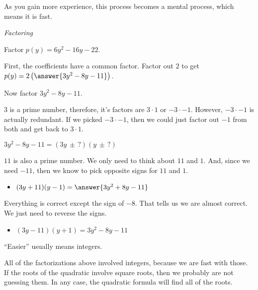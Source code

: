 \documentclass{ximera}
\begin{document}
As you gain more experience, this process becomes a mental process, which means it is fast.






\begin{example} \textit{Factoring}

Factor $p(y) = 6 y^2 - 16 y - 22$.

\begin{explanation}

First, the coefficients have a common factor.  Factor out $2$ to get $p(y) = 2 \left( \answer{3 y^2 - 8 y - 11} \right)$.


Now factor $3 y^2 - 8 y - 11$.



$3$ is a prime number, therefore, it's factors are $3 \cdot 1$ or $-3 \cdot -1$. However, $-3 \cdot -1$ is actually redundant.  If we picked $-3 \cdot -1$, then we could just factor out $-1$ from both and get back to $3 \cdot 1$.


$3 y^2 - 8 y - 11 = (3y \, \pm \, ?) (y \, \pm \, ?) $


$11$ is also a prime number. We only need to think about $11$ and $1$. And, since we need $-11$, then we know to pick opposite signs for $11$ and $1$.



\begin{itemize}
\item $(3y + 11) (y - 1) = \answer{3 y^2 + 8 y - 11}$
\end{itemize}

Everything is correct except the sign of $-8$. That tells us we are almost correct. We just need to reverse the signs.


\begin{itemize}
\item $(3y - 11) (y + 1) = 3 y^2 - 8 y - 11$
\end{itemize}




\end{explanation}
\end{example}


``Easier'' usually means integers.  

All of the factorizations above involved integers, because we are fast with those. \\



If the roots of the quadratic involve square roots, then we probably are not guessing them.  In any case, the quadratic formula will find all of the roots.
\end{document}
